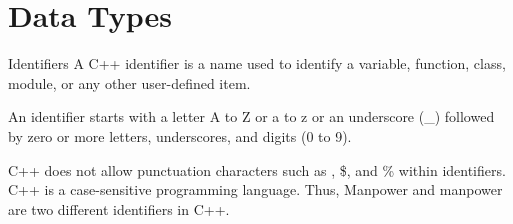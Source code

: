 \documentclass[../lecture2-variables.tex]{subfiles}
\begin{document}
\section{Data Types}


\begin{frame}[fragile]{Identifiers}
    A C++ identifier is a name used to identify a variable, function, class,
    module, or any other user-defined item. \newline \newline

    An identifier starts with a letter A to Z or a to z or an underscore (\_)
    followed by zero or more letters, underscores, and digits (0 to 9). \newline \newline

    C++ does not allow punctuation characters such as \@, \$, and \% within
    identifiers. C++ is a case-sensitive programming language. Thus, Manpower
    and manpower are two different identifiers in C++.
\end{frame}

\end{document}
